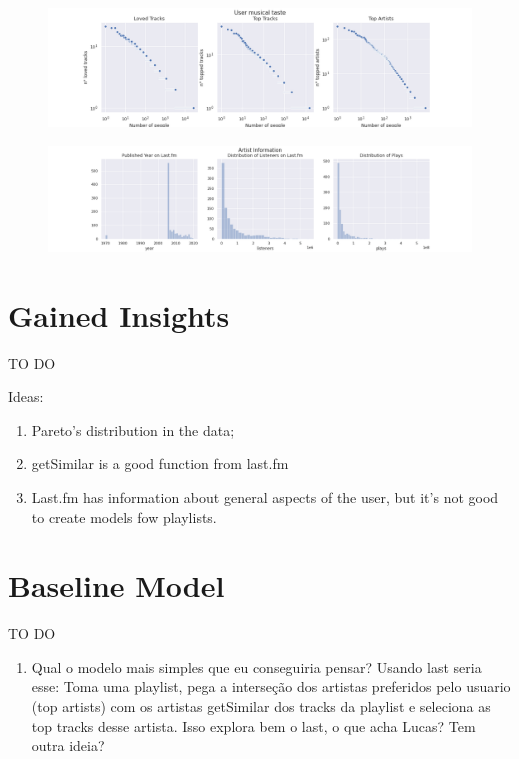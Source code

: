 \documentclass{article}
\begin{document}
\begin{figure}[!h]
  \centering
  \label{fig:top-loved}
  \includegraphics[width = \textwidth]{../../images/top-loved-tracks.png}
\end{figure}

\begin{figure}[!h]
  \centering
  \label{fig:artist-info}
  \includegraphics[width = \textwidth]{../../images/artist_info.png}
\end{figure}

\section{Gained Insights}

TO DO 

Ideas:
\begin{enumerate}
  \item Pareto's distribution in the data; 
  \item getSimilar is a good function from last.fm
  \item Last.fm has information about general aspects of the user, but it's
  not good to create models fow playlists. 
\end{enumerate}

\section{Baseline Model}

TO DO 
\begin{enumerate}
  \item Qual o modelo mais simples que eu conseguiria pensar? Usando last
  seria esse: Toma uma playlist, pega a interseção dos artistas preferidos
  pelo usuario (top artists) com os artistas getSimilar dos tracks da playlist
  e seleciona as top tracks desse artista. Isso explora bem o last, o que acha
  Lucas? Tem outra ideia? 
\end{enumerate}
\end{document}
